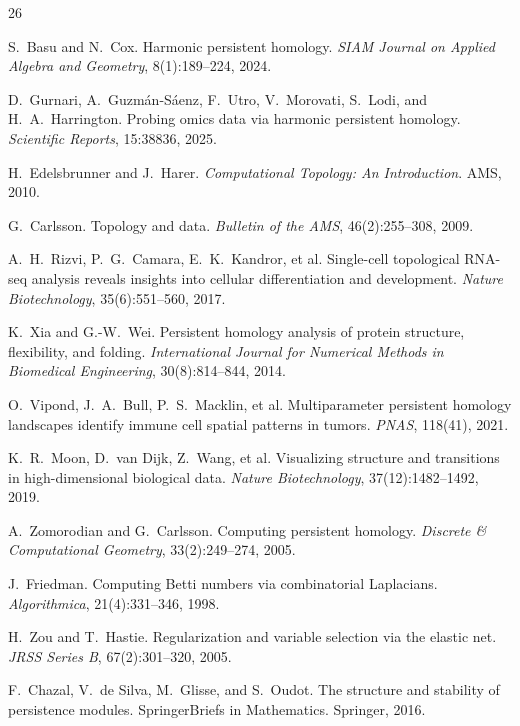 \documentclass[11pt]{article}
\begin{document}

\begin{thebibliography}{26}

S.~Basu and N.~Cox.
Harmonic persistent homology.
\emph{SIAM Journal on Applied Algebra and Geometry}, 8(1):189--224, 2024.

D.~Gurnari, A.~Guzm\'{a}n-S\'{a}enz, F.~Utro, V.~Morovati, S.~Lodi, and H.~A.~Harrington.
Probing omics data via harmonic persistent homology.
\emph{Scientific Reports}, 15:38836, 2025.

H.~Edelsbrunner and J.~Harer.
\emph{Computational Topology: An Introduction}.
AMS, 2010.

G.~Carlsson.
Topology and data.
\emph{Bulletin of the AMS}, 46(2):255--308, 2009.

A.~H.~Rizvi, P.~G.~Camara, E.~K.~Kandror, et al.
Single-cell topological RNA-seq analysis reveals insights into cellular differentiation and development.
\emph{Nature Biotechnology}, 35(6):551--560, 2017.

K.~Xia and G.-W.~Wei.
Persistent homology analysis of protein structure, flexibility, and folding.
\emph{International Journal for Numerical Methods in Biomedical Engineering}, 30(8):814--844, 2014.

O.~Vipond, J.~A.~Bull, P.~S.~Macklin, et al.
Multiparameter persistent homology landscapes identify immune cell spatial patterns in tumors.
\emph{PNAS}, 118(41), 2021.

K.~R.~Moon, D.~van Dijk, Z.~Wang, et al.
Visualizing structure and transitions in high-dimensional biological data.
\emph{Nature Biotechnology}, 37(12):1482--1492, 2019.

A.~Zomorodian and G.~Carlsson.
Computing persistent homology.
\emph{Discrete \& Computational Geometry}, 33(2):249--274, 2005.

J.~Friedman.
Computing Betti numbers via combinatorial Laplacians.
\emph{Algorithmica}, 21(4):331--346, 1998.

H.~Zou and T.~Hastie.
Regularization and variable selection via the elastic net.
\emph{JRSS Series B}, 67(2):301--320, 2005.

F.~Chazal, V.~de Silva, M.~Glisse, and S.~Oudot.
The structure and stability of persistence modules.
SpringerBriefs in Mathematics. Springer, 2016.


\end{thebibliography}
\end{document}
